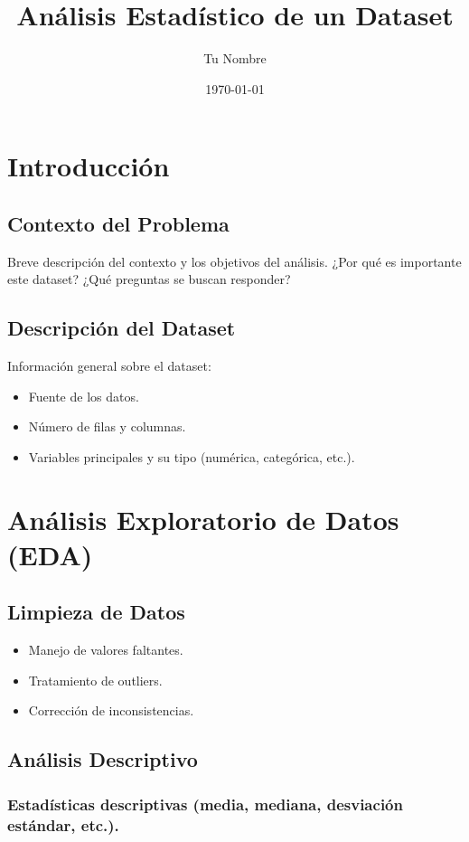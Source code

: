 \documentclass{article}
\title{Análisis Estadístico de un Dataset}
\author{Tu Nombre}
\date{\today}
\begin{document}
\maketitle

\tableofcontents
\newpage

\section{Introducción}
\subsection{Contexto del Problema}
Breve descripción del contexto y los objetivos del análisis. ¿Por qué es importante este dataset? ¿Qué preguntas se buscan responder?

\subsection{Descripción del Dataset}
Información general sobre el dataset:
\begin{itemize}
    \item Fuente de los datos.
    \item Número de filas y columnas.
    \item Variables principales y su tipo (numérica, categórica, etc.).
\end{itemize}

\section{Análisis Exploratorio de Datos (EDA)}
\subsection{Limpieza de Datos}
\begin{itemize}
    \item Manejo de valores faltantes.
    \item Tratamiento de outliers.
    \item Corrección de inconsistencias.
\end{itemize}

\subsection{Análisis Descriptivo}
    \subsubsection{Estadísticas descriptivas (media, mediana, desviación estándar, etc.).}
\end{document}
